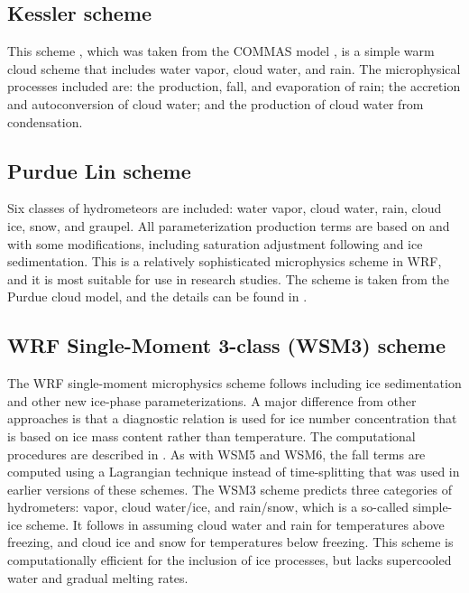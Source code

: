 \subsection{Kessler scheme}

This scheme \citep{kessler69}, which was taken from the COMMAS model
\citep{wicker95}, is a simple 
warm cloud scheme that includes water vapor, cloud water, and rain. 
The microphysical processes included are: the production, fall, and 
evaporation of rain; the accretion and autoconversion of cloud water;
and the production of cloud water from condensation.

\subsection{Purdue Lin scheme}

Six classes of hydrometeors are included: water vapor, cloud water, rain, cloud ice, 
snow, and graupel. All parameterization production terms are based on \citet{lin83}
and \citet{rutledge84} with some modifications, including saturation 
adjustment following \citet{tao89} and ice sedimentation. This is a relatively 
sophisticated microphysics scheme in WRF, and it is most suitable for use 
in research studies. The scheme is taken from the Purdue cloud model, and 
the details can be found in \citet{chen02}.

\subsection{WRF Single-Moment 3-class (WSM3) scheme}

The WRF single-moment microphysics scheme follows \citet{hong04} including ice sedimentation and other new ice-phase parameterizations. A major difference from other approaches is that a diagnostic relation is used for ice number concentration that is based on ice mass content rather than temperature. The computational procedures are described in \citet{honglim06}. As with WSM5 and WSM6, the fall terms are computed using a Lagrangian technique instead of time-splitting that was used in earlier versions of these schemes. The WSM3 scheme predicts three categories of hydrometers: vapor, cloud water/ice, and rain/snow, which is a so-called simple-ice scheme. It follows \citet{dudhia89} in assuming cloud water and rain for temperatures above freezing, and cloud ice and snow for temperatures below freezing. This scheme is computationally efficient for the inclusion of ice processes, but lacks supercooled water and gradual melting rates. 

